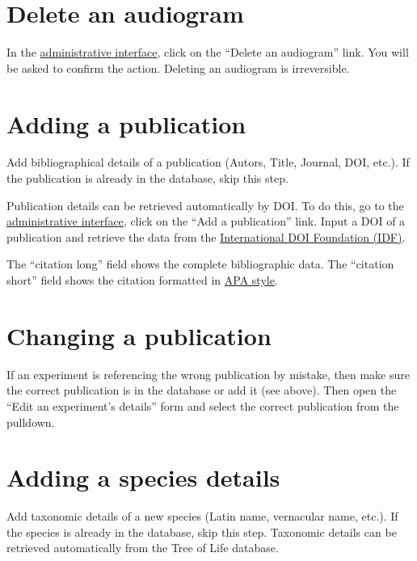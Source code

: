 \documentclass{article}
\begin{document}
\section{Delete an audiogram}
In the \href{https://animalaudiograms.museumfuernaturkunde.berlin/admin/v1/start}{administrative interface}, click on the ``Delete an audiogram'' link. You will be asked to confirm the action. Deleting an audiogram is irreversible.

\section{Adding a publication}
Add bibliographical details of a publication (Autors, Title, Journal, DOI, etc.). If the publication is already in the database, skip this step.

Publication details can be retrieved automatically by DOI. To do this, go to the \href{https://animalaudiograms.museumfuernaturkunde.berlin/admin/v1/start}{administrative interface}, click on the ``Add a publication'' link. Input a DOI of a publication and retrieve the data from the \href{https://www.doi.org/}{International DOI Foundation (IDF)}.

The ``citation long'' field shows the complete bibliographic data. The ``citation short'' field shows the citation formatted in \href{https://apastyle.apa.org}{APA style}.

\section{Changing a publication}
If an experiment is referencing the wrong publication by mistake, then make sure the correct publication is in the database or add it (see above). Then open the ``Edit an experiment's details'' form and select the correct publication from the pulldown.

\section{Adding a species details}
Add taxonomic details of a new species (Latin name, vernacular name, etc.). If the species is already in the database, skip this step. Taxonomic details can be retrieved automatically from the Tree of Life database.
\end{document}
